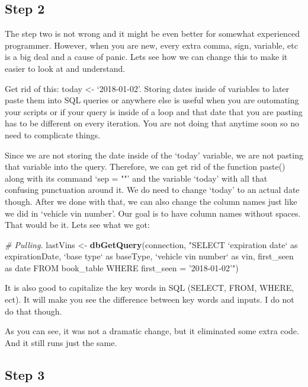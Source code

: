 \documentclass[]{book}
\newenvironment{Shaded}{\begin{snugshade}}{\end{snugshade}}
\newcommand{\CommentTok}[1]{\textcolor[rgb]{0.56,0.35,0.01}{\textit{#1}}}
\newcommand{\KeywordTok}[1]{\textcolor[rgb]{0.13,0.29,0.53}{\textbf{#1}}}
\newcommand{\NormalTok}[1]{#1}
\newcommand{\StringTok}[1]{\textcolor[rgb]{0.31,0.60,0.02}{#1}}
\begin{document}
\hypertarget{step-2-2}{%
\subsection{Step 2}\label{step-2-2}}

The step two is not wrong and it might be even better for somewhat experienced programmer. However, when you are new, every extra comma, sign, variable, etc is a big deal and a cause of panic. Lets see how we can change this to make it easier to look at and understand.

Get rid of this: today \textless{}- `2018-01-02'. Storing dates inside of variables to later paste them into SQL queries or anywhere else is useful when you are outomating your scripts or if your query is inside of a loop and that date that you are pasting has to be different on every iteration. You are not doing that anytime soon so no need to complicate things.

Since we are not storing the date inside of the `today' variable, we are not pasting that variable into the query. Therefore, we can get rid of the function paste() along with its command `sep = ""' and the variable `today' with all that confusing punctuation around it. We do need to change `today' to an actual date though. After we done with that, we can also change the column names just like we did in `vehicle vin number'. Our goal is to have column names without spaces. That would be it. Lets see what we got:

\begin{Shaded}
\begin{Highlighting}[]
\CommentTok{# Pulling.}
\NormalTok{lastVins <-}\StringTok{ }\KeywordTok{dbGetQuery}\NormalTok{(connection, }
\StringTok{"SELECT}
\StringTok{`expiration date` as expirationDate, }
\StringTok{`base type` as baseType,}
\StringTok{`vehicle vin number` as vin, }
\StringTok{first_seen as date }
\StringTok{FROM book_table }
\StringTok{WHERE first_seen = '2018-01-02'"}\NormalTok{)}
\end{Highlighting}
\end{Shaded}

It is also good to capitalize the key words in SQL (SELECT, FROM, WHERE, ect). It will make you see the difference between key words and inputs. I do not do that though.

As you can see, it was not a dramatic change, but it eliminated some extra code. And it still runs just the same.

\hypertarget{step-3-2}{%
\subsection{Step 3}\label{step-3-2}}
\end{document}
